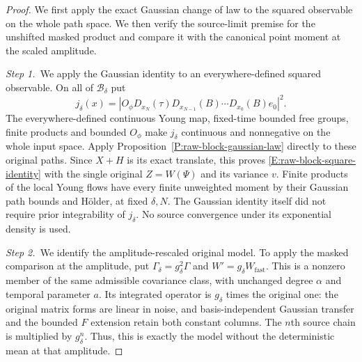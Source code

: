 \begin{proof}
  We first apply the exact Gaussian change of law to the squared observable on
  the whole path space. We then verify the source-limit premise for the
  unshifted masked product and compare it with the canonical point moment at
  the scaled amplitude.


  \medskip
  \noindent\textit{Step 1.~}We apply the Gaussian identity to an
  everywhere-defined squared observable.
  On all of $\mathscr{B}_\delta$ put
  \[
    j_\delta(x)=
    |O_\phi D_{x_N}(\tau)D_{x_{N-1}}(B)\cdots D_{x_0}(B)e_0|^2.
  \]
  The everywhere-defined continuous Young map, fixed-time bounded free groups,
  finite products and bounded $O_\phi$ make $j_\delta$ continuous and
  nonnegative on the whole input space. Apply
  Proposition~\ref{P:raw-block-gaussian-law} directly to these original paths.
  Since $X+H$ is its exact translate, this proves
  \eqref{E:raw-block-square-identity} with the single original $Z = W(\Psi)$ and
  its variance $v$. Finite products of the local Young flows have every finite
  unweighted moment by their Gaussian path bounds and H\"older, at fixed
  $\delta,N$. The Gaussian identity itself did not require prior integrability
  of $j_\delta$. No source convergence under its exponential density is used.


  \medskip
  \noindent\textit{Step 2.~}We identify the amplitude-rescaled original model.
  To apply the masked comparison at the amplitude, put $\Gamma_\delta =
  g_\delta^2\Gamma$ and $W' = g_\delta W_{\mathrm{fast}}$. This is a nonzero
  member of the same admissible covariance class, with unchanged degree $\alpha$
  and temporal parameter $a$. Its integrated operator is $g_\delta$ times the
  original one: the original matrix forms are linear in noise, and
  basis-independent Gaussian transfer and the bounded $F$ extension retain both
  constant columns. The $n$th source chain is multiplied by $g_\delta^n$. Thus,
  this is exactly the model without the deterministic mean at that amplitude.



\end{proof}
